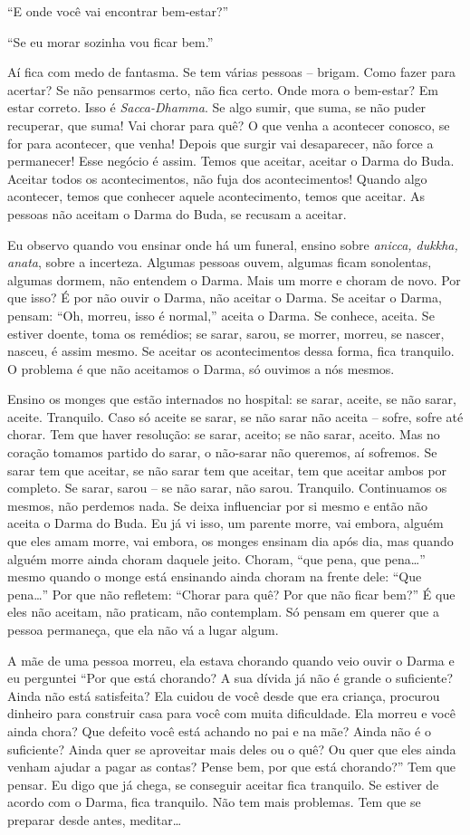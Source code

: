 “E onde você vai encontrar bem-estar?”

“Se eu morar sozinha vou ficar bem.”

Aí fica com medo de fantasma. Se tem várias pessoas – brigam. Como
fazer para acertar? Se não pensarmos certo, não fica certo. Onde mora o
bem-estar? Em estar correto. Isso é \emph{Sacca-Dhamma}. Se algo
sumir, que suma, se não puder recuperar, que suma! Vai chorar para quê?
O que venha a acontecer conosco, se for para acontecer, que venha!
Depois que surgir vai desaparecer, não force a permanecer! Esse negócio
é assim. Temos que aceitar, aceitar o Darma do Buda. Aceitar todos os
acontecimentos, não fuja dos acontecimentos! Quando algo acontecer,
temos que conhecer aquele acontecimento, temos que aceitar. As pessoas
não aceitam o Darma do Buda, se recusam a aceitar. 

Eu observo quando vou ensinar onde há um funeral, ensino sobre
\emph{anicca, dukkha, anata}, sobre a incerteza. Algumas pessoas
ouvem, algumas ficam sonolentas, algumas dormem, não entendem o Darma.
Mais um morre e choram de novo. Por que isso? É por não ouvir o Darma,
não aceitar o Darma. Se aceitar o Darma, pensam: “Oh, morreu, isso é
normal,” aceita o Darma. Se conhece, aceita. Se estiver doente, toma os
remédios; se sarar, sarou, se morrer, morreu, se nascer, nasceu, é
assim mesmo. Se aceitar os acontecimentos dessa forma, fica tranquilo.
O problema é que não aceitamos o Darma, só ouvimos a nós mesmos.

Ensino os monges que estão internados no hospital: se sarar, aceite,
se não sarar, aceite. Tranquilo. Caso só aceite se sarar, se não sarar
não aceita – sofre, sofre até chorar. Tem que haver resolução: se
sarar, aceito; se não sarar, aceito. Mas no coração tomamos partido do
sarar, o não-sarar não queremos, aí sofremos. Se sarar tem que aceitar,
se não sarar tem que aceitar, tem que aceitar ambos por completo. Se
sarar, sarou – se não sarar, não sarou. Tranquilo. Continuamos os
mesmos, não perdemos nada. Se deixa influenciar por si mesmo e então
não aceita o Darma do Buda. Eu já vi isso, um parente morre, vai
embora, alguém que eles amam morre, vai embora, os monges ensinam dia
após dia, mas quando alguém morre ainda choram daquele jeito. Choram,
“que pena, que pena\ldots{}” mesmo quando o monge está ensinando ainda choram
na frente dele: “Que pena\ldots{}” Por que não refletem: “Chorar para quê? Por
que não ficar bem?” É que eles não aceitam, não praticam, não
contemplam. Só pensam em querer que a pessoa permaneça, que ela não vá
a lugar algum.

A mãe de uma pessoa morreu, ela estava chorando quando veio ouvir o
Darma e eu perguntei “Por que está chorando? A sua dívida já não é
grande o suficiente? Ainda não está satisfeita? Ela cuidou de você
desde que era criança, procurou dinheiro para construir casa para você
com muita dificuldade. Ela morreu e você ainda chora? Que defeito você
está achando no pai e na mãe? Ainda não é o suficiente? Ainda quer se
aproveitar mais deles ou o quê? Ou quer que eles ainda venham ajudar a
pagar as contas? Pense bem, por que está chorando?” Tem que pensar. Eu
digo que já chega, se conseguir aceitar fica tranquilo. Se estiver de
acordo com o Darma, fica tranquilo. Não tem mais problemas. Tem que se
preparar desde antes, meditar\ldots{}
